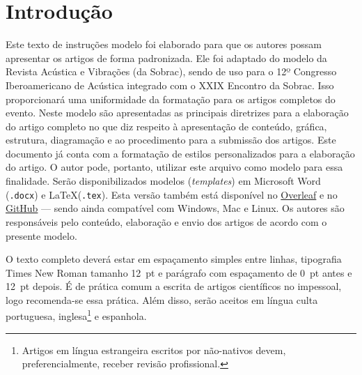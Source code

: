 \documentclass[12pt, a4paper, twoside, twocolumn]{article}
\begin{document}
 \setcounter{page}{1} 
\clearpage %

\section{Introdução}

Este texto de instruções modelo foi elaborado para que os autores possam apresentar os artigos de forma padronizada. 
Ele foi adaptado do modelo da Revista Acústica e Vibrações (da Sobrac), sendo de uso para o 12º Congresso Iberoamericano de Acústica integrado com o  XXIX Encontro da Sobrac.
%
Isso proporcionará uma uniformidade da formatação para os artigos completos do evento.
Neste modelo são apresentadas as principais diretrizes para a elaboração do artigo completo no que diz respeito à apresentação de conteúdo, gráfica, estrutura, diagramação e ao procedimento para a submissão dos artigos. 
Este documento já conta com a formatação de estilos personalizados para a elaboração do artigo. O autor pode, portanto, utilizar este arquivo como modelo para essa finalidade. Serão disponibilizados modelos (\textit{templates}) em Microsoft Word (\texttt{.docx}) e \LaTeX\xspace (\texttt{.tex}). Esta versão também está disponível no \href{https://www.overleaf.com/read/rnfjxkknksnd}{Overleaf} e no \href{https://github.com/willdfonseca/fia2020}{GitHub} --- sendo ainda compatível com Windows, Mac e Linux. 
Os autores são responsáveis pelo conteúdo, elaboração e envio dos artigos de acordo com o presente modelo.


O texto completo deverá estar em espaçamento simples entre linhas, tipografia Times New Roman tamanho 12~pt e parágrafo com espaçamento de 0~pt antes e 12~pt depois. É de prática comum a escrita de artigos científicos no impessoal, logo recomenda-se essa prática. Além disso, serão aceitos em língua culta portuguesa, inglesa\footnote{Artigos em língua estrangeira escritos por não-nativos devem, preferencialmente, receber revisão profissional.} e espanhola. 
\end{document}
